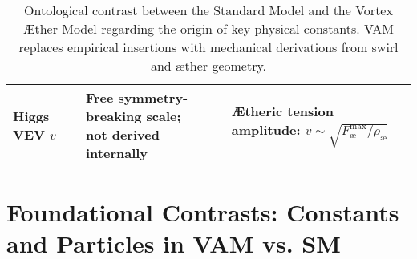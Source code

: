 \begin{table}[H]
\begin{tabular}{|l|l|l|}
        \makecell[l]{Higgs VEV \\ $v$} &
        \makecell[l]{Free symmetry-breaking scale; \\ not derived internally} &
        \makecell[l]{Ætheric tension amplitude: \\ $v \sim \sqrt{F^{\text{max}}_{\text{\ae}}/\rho_\text{\ae}}$} \\
        \hline

    \end{tabular}
    \caption{Ontological contrast between the Standard Model and the Vortex Æther Model regarding the origin of key physical constants. VAM replaces empirical insertions with mechanical derivations from swirl and æther geometry.}
    \label{tab:SM_vs_VAM_constants}
\end{table}

\section*{Foundational Contrasts: Constants and Particles in VAM vs. SM}

